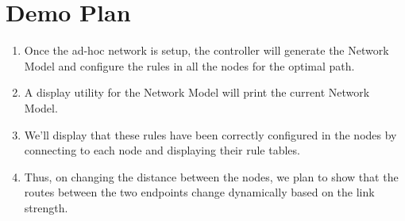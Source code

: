 \documentclass{article}
\begin{document}
\section{Demo Plan}
\begin{enumerate}
\item Once the ad-hoc network is setup, the controller will generate the Network Model and configure the rules in all
the nodes for the optimal path.
\item A display utility for the Network Model will print the current Network Model.
\item We'll display that these rules have been correctly configured in the nodes by connecting to each node and
displaying their rule tables.
\item Thus, on changing the distance between the nodes, we plan to show that the routes between the two endpoints change
dynamically based on the link strength. 
\end{enumerate}
\end{document}
